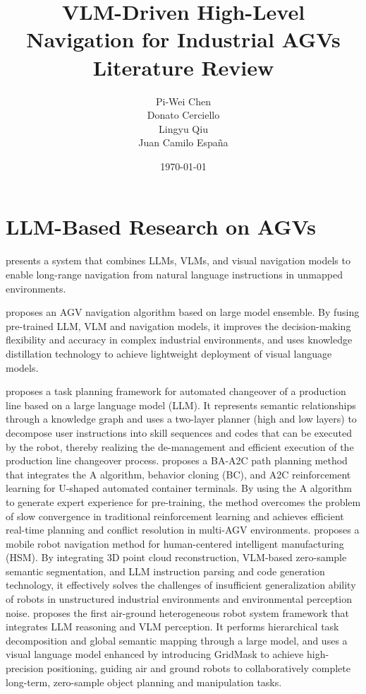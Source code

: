 \documentclass[11pt,a4paper]{article}
\title{VLM-Driven High-Level Navigation for Industrial AGVs\\
\large Literature Review }
\author{
Pi-Wei Chen \\
Donato Cerciello \\
Lingyu Qiu \\
Juan Camilo España
}
\date{\today}
\begin{document}
\maketitle


\section{LLM-Based Research on AGVs}
\cite{shah2023lm}
presents a system that combines LLMs, VLMs, and visual navigation models to enable long-range navigation from natural language instructions in unmapped environments.

\cite{lu2024optimization} proposes an AGV navigation algorithm based on large model ensemble. By fusing pre-trained LLM, VLM and navigation models, it improves the decision-making flexibility and accuracy in complex industrial environments, and uses knowledge distillation technology to achieve lightweight deployment of visual language models.

\cite{hou2025framework} proposes a task planning framework for automated changeover of a production line based on a large language model (LLM). It represents semantic relationships through a knowledge graph and uses a two-layer planner (high and low layers) to decompose user instructions into skill sequences and codes that can be executed by the robot, thereby realizing the de-management and efficient execution of the production line changeover process.
\cite{lu2025conflict} proposes a BA-A2C path planning method that integrates the A algorithm, behavior cloning (BC), and A2C reinforcement learning for U-shaped automated container terminals. By using the A algorithm to generate expert experience for pre-training, the method overcomes the problem of slow convergence in traditional reinforcement learning and achieves efficient real-time planning and conflict resolution in multi-AGV environments.
\cite{wang2025vision} proposes a mobile robot navigation method for human-centered intelligent manufacturing (HSM). By integrating 3D point cloud reconstruction, VLM-based zero-sample semantic segmentation, and LLM instruction parsing and code generation technology, it effectively solves the challenges of insufficient generalization ability of robots in unstructured industrial environments and environmental perception noise.
\cite{liu2025hierarchical} proposes the first air-ground heterogeneous robot system framework that integrates LLM reasoning and VLM perception. It performs hierarchical task decomposition and global semantic mapping through a large model, and uses a visual language model enhanced by introducing GridMask to achieve high-precision positioning, guiding air and ground robots to collaboratively complete long-term, zero-sample object planning and manipulation tasks.
\end{document}
